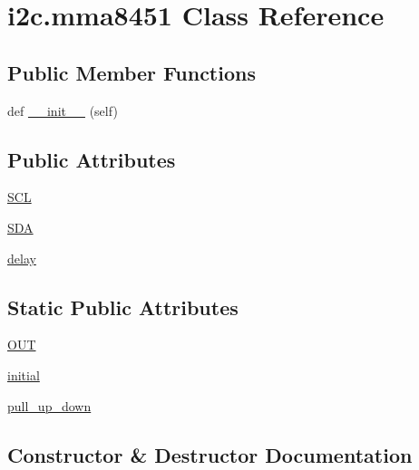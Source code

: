 \hypertarget{classi2c_1_1mma8451}{}\section{i2c.\+mma8451 Class Reference}
\label{classi2c_1_1mma8451}
\subsection*{Public Member Functions}
\begin{DoxyCompactItemize}
\item 
def \hyperlink{classi2c_1_1mma8451_a669101f7928bfbfd7d88bf1050b6e37e}{\+\_\+\+\_\+init\+\_\+\+\_\+} (self)
\end{DoxyCompactItemize}
\subsection*{Public Attributes}
\begin{DoxyCompactItemize}
\item 
\hyperlink{classi2c_1_1mma8451_adf12ccdab3e49465e7beb5ebb66f0444}{S\+CL}
\item 
\hyperlink{classi2c_1_1mma8451_a5fcacc327ae982eafebbefee1efbe80d}{S\+DA}
\item 
\hyperlink{classi2c_1_1mma8451_ad0c83ff97a13fba0d7c44c80d9a70686}{delay}
\end{DoxyCompactItemize}
\subsection*{Static Public Attributes}
\begin{DoxyCompactItemize}
\item 
\hyperlink{classi2c_1_1mma8451_a7df24a14a160334d72a5e597487c65e4}{O\+UT}
\item 
\hyperlink{classi2c_1_1mma8451_acae3fde5fd350eb5d26a2f34dfc62db8}{initial}
\item 
\hyperlink{classi2c_1_1mma8451_abec3551718469e9eecbcded66938af50}{pull\+\_\+up\+\_\+down}
\end{DoxyCompactItemize}


\subsection{Constructor \& Destructor Documentation}
\mbox{\label{classi2c_1_1mma8451_a669101f7928bfbfd7d88bf1050b6e37e}} 
